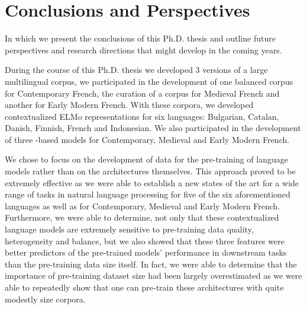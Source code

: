\chapter{Conclusions and Perspectives}\label{chap:conclusions}

\begin{center}
    \begin{minipage}{0.66\textwidth}
        \begin{small}
            In which we present the conclusions of this Ph.D. thesis and outline future perspectives and research directions that might develop in the coming years.
        \end{small}
    \end{minipage}
    \vspace{0.5cm}
\end{center}

During the course of this Ph.D. thesis we developed 3 versions of a large multilingual corpus, we participated in the development of one balanced corpus for Contemporary French, the curation of a corpus for Medieval French and another for Early Modern French. With these corpora, we developed contextualized ELMo representations \citep{peters-etal-2018-deep} for six languages: Bulgarian, Catalan, Danish, Finnish, French and Indonesian. We also participated in the development of three \roberta-based \citep{liu-etal-2019-roberta} models for Contemporary, Medieval and Early Modern French. 

We chose to focus on the development of data for the pre-training of language models rather than on the architectures themselves. This approach proved to be extremely effective as we were able to establish a new states of the art for a wide range of tasks in natural language processing for five of the six aforementioned languages as well as for Contemporary, Medieval and Early Modern French. Furthermore, we were able to determine, not only that these contextualized language models are extremely sensitive to pre-training data quality, heterogeneity and balance, but we also showed that these three features were better predictors of the pre-trained models' performance in downstream tasks than the pre-training data size itself. In fact, we were able to determine that the importance of pre-training dataset size had been largely overestimated \citep{martin-etal-2020-camembert} as we were able to repeatedly show that one can pre-train these architectures with quite modestly size corpora.


